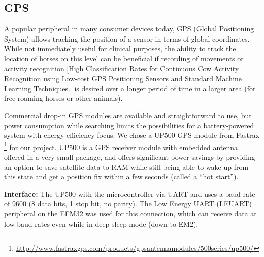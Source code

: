 \subsection{GPS}
A popular peripheral in many consumer devices today, GPS (Global Positioning System) allows tracking the position of a sensor in terms of global coordinates. While not immediately useful for clinical purposes, the ability to track the location of horses on this level can be beneficial if recording of movements or activity recognition   [High Classification Rates for Continuous Cow Activity Recognition using Low-cost GPS Positioning Sensors and Standard Machine Learning Techniques.]  is desired over a longer period of time in a larger area (for free-roaming horses or other animals). 

Commercial drop-in GPS modules are available and straightforward to use, but power consumption while searching limits the possibilities for a battery-powered system with energy efficiency focus. We chose a UP500 GPS module from Fastrax \footnote{\url{http://www.fastraxgps.com/products/gpsantennamodules/500series/up500/}}
for our project. UP500 is a GPS receiver module with embedded antenna offered in a very small package, and offers significant power savings by providing an option to save satellite data to RAM while still being able to wake up from this state and get a position fix within a few seconds (called a “hot start”). 

\textbf{Interface:} The UP500 with the microcontroller via UART and uses a baud rate of 9600 (8 data bits, 1 stop bit, no parity). The Low Energy UART (LEUART) peripheral on the EFM32 was used for this connection, which can receive data at low baud rates even while in deep sleep mode (down to EM2).


